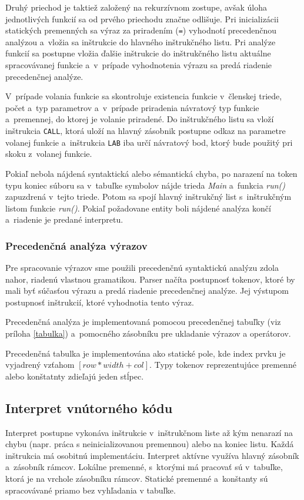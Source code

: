 \documentclass[11pt,a4paper]{article}
\begin{document}
	Druhý priechod je taktiež založený na rekurzívnom zostupe, avšak úloha
	jednotlivých funkcií sa od prvého priechodu značne odlišuje.
	Pri inicializácii statických premenných sa výraz za priradením (\texttt{=})
	vyhodnotí precedenčnou analýzou a~vložia sa inštrukcie do hlavného
	inštrukčného listu. Pri analýze funkcií sa postupne vložia ďalšie inštrukcie
	do inštrukčného listu aktuálne spracovávanej funkcie a~v~prípade vyhodnotenia
	výrazu  sa predá riadenie precedenčnej analýze.

	V~prípade volania funkcie sa skontroluje existencia funkcie v~členskej
	triede, počet a~typ parametrov a~v~prípade priradenia  návratový typ
	funkcie a~premennej, do ktorej je volanie priradené. Do inštrukčného
	listu sa vloží inštrukcia \texttt{CALL}, ktorá uloží na hlavný zásobnik
	postupne odkaz na parametre volanej funkcie a~inštrukcia \texttt{LAB}
	iba určí návratový bod, ktorý bude použitý pri skoku z~volanej funkcie.

	Pokiaľ nebola nájdená syntaktická alebo sémantická chyba, po narazení na
	token typu koniec súboru sa v~tabuľke symbolov nájde trieda \emph{Main}
	a~funkcia \emph{run()} zapuzdrená v~tejto triede. Potom sa spojí hlavný inštrukčný
	list s~inštrukčným listom funkcie \emph{run()}. Pokiaľ požadovane entity
	boli nájdené analýza končí a~riadenie je predané interpretu.

	\subsubsection{Precedenčná analýza výrazov}
	\label{precedencna analyza}

	Pre spracovanie výrazov sme použili precedenčnú syntaktickú analýzu zdola nahor,
	riadenú vlastnou gramatikou.
	Parser načíta postupnosť tokenov, ktoré by mali byť súčasťou výrazu a predá
	riadenie precedenčnej analýze. Jej výstupom postupnosť inštrukcií, ktoré vyhodnotia tento výraz.

    Precedenčná analýza je implementovaná pomocou precedenčnej tabuľky (viz
    príloha \ref{tabulka}) a~pomocného zásobníku pre ukladanie výrazov a operátorov.

	Precedenčná tabulka je implementována ako statické pole, kde index prvku je vyjadrený vzťahom $[row * width + col]$.
	Typy tokenov reprezentujúce premenné alebo konštatnty zdieľajú jeden stĺpec.


	\subsection{Interpret vnútorného kódu}
	\label{interpret}
	Interpret postupne vykonáva inštrukcie v~inštrukčnom liste až kým nenarazí
	na chybu (napr. práca s neinicializovanou premennou) alebo na koniec listu.
	Každá inštrukcia má osobitnú implementáciu. Interpret aktívne využíva hlavný
	zásobník a~zásobník rámcov. Lokálne premenné, s~ktorými má pracovať  sú v~tabuľke,
	ktorá je na vrchole zásobníku rámcov. Statické premenné a~konštanty sú spracovávané
	priamo bez vyhľadania v tabuľke.
\end{document}
